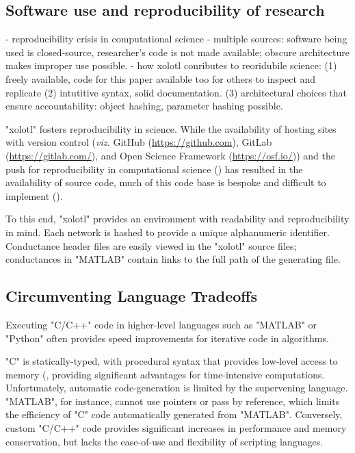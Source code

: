 \documentclass{frontiersSCNS} %
\newcommand{\viz}{\textit{viz.}\xspace}
\begin{document}
\subsection{Software use and reproducibility of research}

- reproducibility crisis in computational science 
- multiple sources: software being used is closed-source, researcher's code is not made available; obscure architecture makes improper use possible. 
- how xolotl conributes to reoridubile science: (1) freely available, code for this paper available too for others to inspect and replicate (2) intutitive syntax, solid documentation. (3) architectural choices that ensure accountability: object hashing, parameter hashing possible. 


"xolotl" fosters reproducibility in science. While the availability of hosting sites with version control (\viz GitHub (\url{https://github.com}), GitLab (\url{https://gitlab.com/}), and Open Science Framework (\url{https://osf.io/})) and the push for reproducibility in computational science (\cite{eklundClusterFailureWhy2016, stoddenEnhancingReproducibilityComputational2016, bakerWhyScientistsMust2016}) has resulted in the availability of source code, much of this code base is bespoke and difficult to implement (\cite{sedanoCodeReadabilityTesting2016, xuMeasurementSourceCode2017}).

To this end, "xolotl" provides an environment with readability and reproducibility in mind. Each network is hashed to provide a unique alphanumeric identifier. Conductance header files are easily viewed in the "xolotl" source files; conductances in "MATLAB" contain links to the full path of the generating file.

\subsection{Circumventing Language Tradeoffs}

Executing "C/C++" code in higher-level languages such as "MATLAB" or "Python" often provides speed improvements for iterative code in algorithms. 

"C" is statically-typed, with procedural syntax that provides low-level access to memory (\cite{kernighanProgrammingLanguage1978}, providing significant advantages for time-intensive computations. Unfortunately, automatic code-generation is limited by the supervening language. "MATLAB", for instance, cannot use pointers or pass by reference, which limits the efficiency of "C" code automatically generated from "MATLAB". Conversely, custom "C/C++" code provides significant increases in performance and memory conservation, but lacks the ease-of-use and flexibility of scripting languages.
\end{document}
